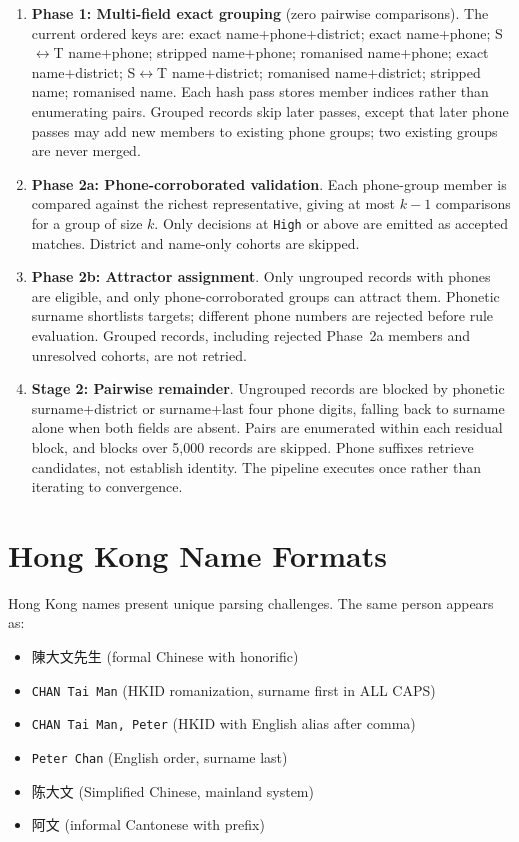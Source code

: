 \documentclass{article}
\begin{document}
\begin{enumerate}
\tightlist
\item \textbf{Phase 1: Multi-field exact grouping} (zero pairwise comparisons). The current ordered keys are: exact name+phone+district; exact name+phone; S$\leftrightarrow$T name+phone; stripped name+phone; romanised name+phone; exact name+district; S$\leftrightarrow$T name+district; romanised name+district; stripped name; romanised name. Each hash pass stores member indices rather than enumerating pairs. Grouped records skip later passes, except that later phone passes may add new members to existing phone groups; two existing groups are never merged.
\item \textbf{Phase 2a: Phone-corroborated validation}. Each phone-group member is compared against the richest representative, giving at most $k-1$ comparisons for a group of size $k$. Only decisions at \texttt{High} or above are emitted as accepted matches. District and name-only cohorts are skipped.
\item \textbf{Phase 2b: Attractor assignment}. Only ungrouped records with phones are eligible, and only phone-corroborated groups can attract them. Phonetic surname shortlists targets; different phone numbers are rejected before rule evaluation. Grouped records, including rejected Phase~2a members and unresolved cohorts, are not retried.
\item \textbf{Stage 2: Pairwise remainder}. Ungrouped records are blocked by phonetic surname+district or surname+last four phone digits, falling back to surname alone when both fields are absent. Pairs are enumerated within each residual block, and blocks over 5,000 records are skipped. Phone suffixes retrieve candidates, not establish identity. The pipeline executes once rather than iterating to convergence.
\end{enumerate}

\section{Hong Kong Name Formats}\label{sec:hknames}

Hong Kong names present unique parsing challenges. The same person appears as:

\begin{itemize}
\tightlist
\item 陳大文先生 (formal Chinese with honorific)
\item \texttt{CHAN Tai Man} (HKID romanization, surname first in ALL CAPS)
\item \texttt{CHAN Tai Man, Peter} (HKID with English alias after comma)
\item \texttt{Peter Chan} (English order, surname last)
\item 陈大文 (Simplified Chinese, mainland system)
\item 阿文 (informal Cantonese with prefix)
\end{itemize}
\end{document}
